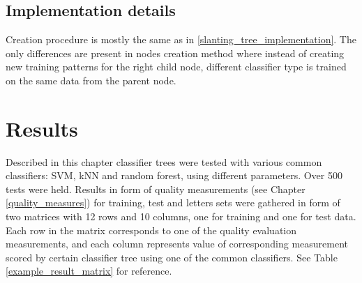 \subsection{Implementation details}

Creation procedure is mostly the same as in \ref{slanting_tree_implementation}. The only differences are present in nodes creation method where instead of creating new training patterns for the right child node, different classifier type is trained on the same data from the parent node.

\section{Results}

Described in this chapter classifier trees were tested with various common classifiers: SVM, kNN and random forest, using different parameters. Over 500 tests were held. Results in form of quality measurements (see Chapter \ref{quality_measures}) for training, test and letters sets were gathered in form of two matrices with 12 rows and 10 columns, one for training and one for test data. Each row in the matrix corresponds to one of the quality evaluation measurements, and each column represents value of corresponding measurement scored by certain classifier tree using one of the common classifiers. See Table \ref{example_result_matrix} for reference.


